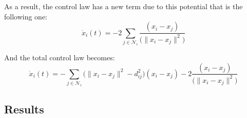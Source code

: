 \documentclass[a4paper,11pt,oneside]{book}
\begin{document}
As a result, the control law has a new term due to this potential that is the following one:
\begin{equation}
\dot{x}_i(t) = - 2\sum_{j \in \mathcal{N}_i} \frac{(x_i-x_j)}{\big( \lVert x_i - x_j \rVert^2 \big)}
\end{equation}

And the total control law becomes:
\begin{equation}
\dot{x}_i(t) = - \sum_{j \in \mathcal{N}_i} \bigg( \lVert x_i - x_j \rVert^2 - d_{ij}^2 \bigg) (x_i - x_j ) - 2 \frac{(x_i-x_j)}{\big( \lVert x_i - x_j \rVert^2 \big)}
\label{Dynamics_with_collision_avoidance}
\end{equation}

\subsection{Results}
\end{document}
